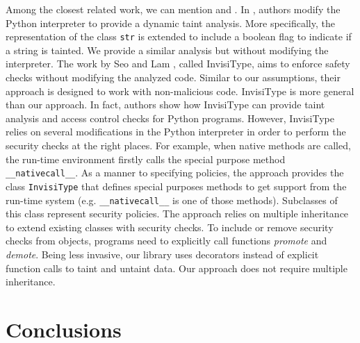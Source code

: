 \documentclass[oribibl]{llncs}
\begin{document}
Among the closest related work, we can mention 
\cite{KozlovPetukhov07} and \cite{SeoLam2010}.
In  \cite{KozlovPetukhov07}, authors modify the Python interpreter 
to provide a dynamic taint analysis. More specifically, %
the representation of the class \texttt{str} is extended to include a boolean 
flag to indicate if a string is tainted. We provide a similar analysis 
but without modifying the interpreter.
The work by Seo and Lam \cite{SeoLam2010}, called InvisiType, 
aims to enforce safety checks without 
modifying the analyzed code. Similar to our assumptions, their approach 
is designed to work with non-malicious code. InvisiType is more general 
than our approach. In fact, authors show how InvisiType can provide taint
analysis and access control checks for Python programs. However, 
InvisiType relies on several modifications in the Python interpreter 
in order to perform the security checks at the right places. 
For example, when native methods are called, 
the run-time environment firstly calls the special purpose 
method \texttt{\_\_nativecall\_\_}.  
As a manner to specifying policies, 
the approach provides the class \texttt{InvisiType} that defines special 
purposes methods to get support from the run-time system (e.g.
\texttt{\_\_nativecall\_\_} is one of those methods). 
Subclasses of this class represent security policies. 
The approach relies on multiple inheritance to 
extend existing classes with security checks. 
To include or remove security checks from objects, 
programs need to explicitly call functions \emph{promote} and 
\emph{demote}. Being less invasive, our library uses 
decorators instead of explicit function calls to taint and
untaint data. 
Our approach does not require 
multiple inheritance. 

\section{Conclusions}
\label{sec:conclusions}
\end{document}
